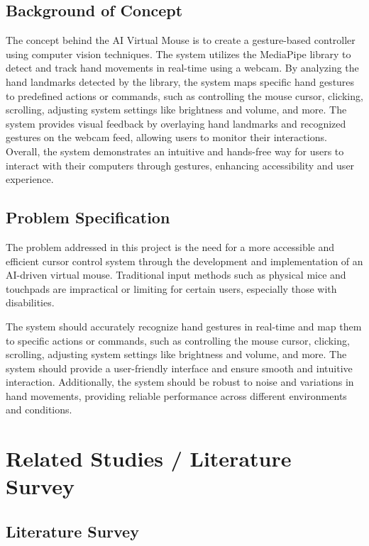 \documentclass[12pt,a4paper]{report}
\begin{document}
\section{Background of Concept}

The concept behind the AI Virtual Mouse is to create a gesture-based controller using
computer vision techniques. The system utilizes the MediaPipe library to detect and track
hand movements in real-time using a webcam. By analyzing the hand landmarks detected by the
library, the system maps specific hand gestures to predefined actions or commands, such as
controlling the mouse cursor, clicking, scrolling, adjusting system settings like brightness
and volume, and more. The system provides visual feedback by overlaying hand landmarks and
recognized gestures on the webcam feed, allowing users to monitor their interactions. Overall,
the system demonstrates an intuitive and hands-free way for users to interact with their
computers through gestures, enhancing accessibility and user experience.

\section{Problem Specification}

The problem addressed in this project is the need for a more accessible and efficient cursor
control system through the development and implementation of an AI-driven virtual mouse.
Traditional input methods such as physical mice and touchpads are impractical or limiting for
certain users, especially those with disabilities.

The system should accurately recognize hand gestures in real-time and map them to specific
actions or commands, such as controlling the mouse cursor, clicking, scrolling, adjusting
system settings like brightness and volume, and more. The system should provide a
user-friendly interface and ensure smooth and intuitive interaction. Additionally, the system
should be robust to noise and variations in hand movements, providing reliable performance
across different environments and conditions.

\chapter{Related Studies / Literature Survey}

\section{Literature Survey}
\end{document}
